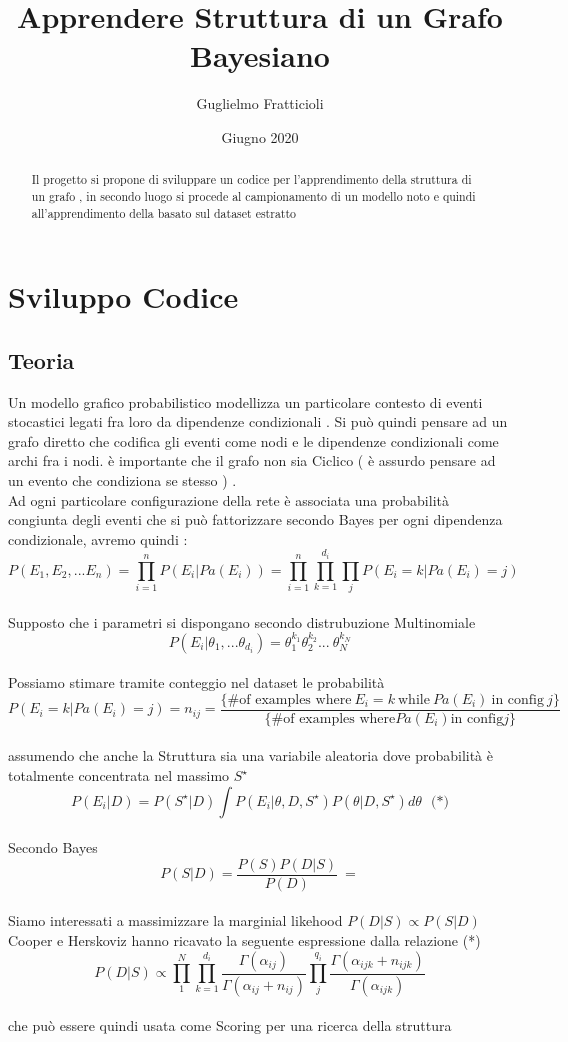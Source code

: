 \documentclass[12pt]{article}
\title{Apprendere Struttura di un Grafo Bayesiano}
\author{Guglielmo Fratticioli}
\date{ Giugno 2020 }
\begin{document}
\maketitle
\begin{abstract}
Il progetto si propone di sviluppare un codice per l'apprendimento della struttura di un grafo ,
 in secondo luogo si procede al campionamento di un modello noto e quindi all'apprendimento della basato sul dataset estratto 
\end{abstract}

\section{ Sviluppo Codice }
\subsection{ Teoria }
Un modello grafico probabilistico modellizza un particolare contesto di eventi stocastici legati fra loro da dipendenze condizionali .
Si può quindi pensare ad un grafo diretto che codifica gli eventi come nodi e le dipendenze condizionali come archi fra i nodi. è importante che il grafo non sia Ciclico 
( è assurdo pensare ad un evento che condiziona se stesso ) .\\
Ad ogni particolare configurazione della rete è associata una probabilità 
congiunta degli eventi che si può fattorizzare secondo Bayes per ogni 
dipendenza condizionale, avremo quindi :  
\[P(E_1, E_2, ... E_n ) = \prod_{i=1}^n P(E_i | Pa(E_i)) = \prod_{i=1}^n \prod_{k=1}^{d_i} \prod_j P(E_i = k | Pa(E_i) = j )\]
\\Supposto che i parametri si dispongano secondo distrubuzione Multinomiale 
\[ P(E_i|\theta_1, ... \theta_{d_i}) = \theta_1^{k_1} \theta_2^{k_2} ...\ \theta_N^{k_N}  \]
\\Possiamo stimare tramite conteggio nel dataset le probabilità 
\[ P(E_i = k | Pa(E_i) = j ) = n_{ij} = \frac {\{\# \textrm{of examples where}\  E_i = k\  \textrm{while}\  Pa(E_i)\  \textrm{in config}\  j\} } { \{\# \textrm{of examples where} Pa(E_i) \textrm{in config} j\} } \]
\\assumendo che anche la Struttura sia una variabile aleatoria 
dove probabilità è totalmente concentrata nel massimo $S^\star$
\[ P(E_i | D ) = P(S^\star|D) \int P( E_i|\theta, D, S^\star )P(\theta| D,S^\star) d\theta \ \ \  \textrm{(*)} \] 
\\Secondo Bayes 
\[ P(S|D) = \frac{P(S) P(D|S)}{P(D)}\ = \]
\\Siamo interessati a massimizzare la marginial likehood $P(D|S) \propto P(S|D) $ 
Cooper e Herskoviz hanno ricavato la seguente espressione dalla relazione (*)
\[ P(D|S) \propto \prod_1^N \prod_{k=1}^{d_i} \frac{\Gamma(\alpha_{ij})}{\Gamma(\alpha_{ij} + n_{ij})} \prod_j^{q_i} \frac{\Gamma(\alpha_{ijk} + n_{ijk} )}{\Gamma(\alpha_{ijk})}\]
\\che può essere quindi usata come Scoring per una ricerca della struttura 
\end{document}
